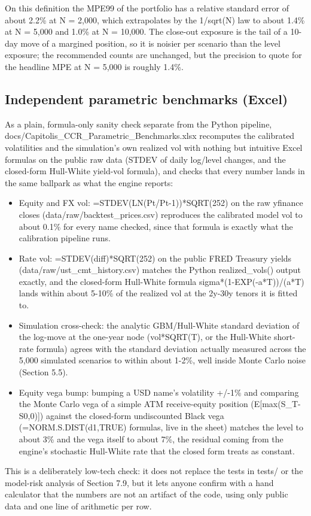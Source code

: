 \documentclass[11pt,letterpaper]{article}
\begin{document}
On this definition the MPE99 of the portfolio has a relative standard error of about 2.2\% at N = 2,000, which extrapolates by the 1/sqrt(N) law to about 1.4\% at N = 5,000 and 1.0\% at N = 10,000. The close-out exposure is the tail of a 10-day move of a margined position, so it is noisier per scenario than the level exposure; the recommended counts are unchanged, but the precision to quote for the headline MPE at N = 5,000 is roughly 1.4\%.

\subsection{Independent parametric benchmarks (Excel)}
As a plain, formula-only sanity check separate from the Python pipeline, docs/Capitolis\_CCR\_Parametric\_Benchmarks.xlsx recomputes the calibrated volatilities and the simulation's own realized vol with nothing but intuitive Excel formulas on the public raw data (STDEV of daily log/level changes, and the closed-form Hull-White yield-vol formula), and checks that every number lands in the same ballpark as what the engine reports:

\begin{itemize}
\item Equity and FX vol: =STDEV(LN(Pt/Pt-1))*SQRT(252) on the raw yfinance closes (data/raw/backtest\_prices.csv) reproduces the calibrated model vol to about 0.1\% for every name checked, since that formula is exactly what the calibration pipeline runs.
\item Rate vol: =STDEV(diff)*SQRT(252) on the public FRED Treasury yields (data/raw/ust\_cmt\_history.csv) matches the Python realized\_vols() output exactly, and the closed-form Hull-White formula sigma*(1-EXP(-a*T))/(a*T) lands within about 5-10\% of the realized vol at the 2y-30y tenors it is fitted to.
\item Simulation cross-check: the analytic GBM/Hull-White standard deviation of the log-move at the one-year node (vol*SQRT(T), or the Hull-White short-rate formula) agrees with the standard deviation actually measured across the 5,000 simulated scenarios to within about 1-2\%, well inside Monte Carlo noise (Section 5.5).
\item Equity vega bump: bumping a USD name's volatility +/-1\% and comparing the Monte Carlo vega of a simple ATM receive-equity position (E[max(S\_T-S0,0)]) against the closed-form undiscounted Black vega (=NORM.S.DIST(d1,TRUE) formulas, live in the sheet) matches the level to about 3\% and the vega itself to about 7\%, the residual coming from the engine's stochastic Hull-White rate that the closed form treats as constant.
\end{itemize}
This is a deliberately low-tech check: it does not replace the tests in tests/ or the model-risk analysis of Section 7.9, but it lets anyone confirm with a hand calculator that the numbers are not an artifact of the code, using only public data and one line of arithmetic per row.
\end{document}
